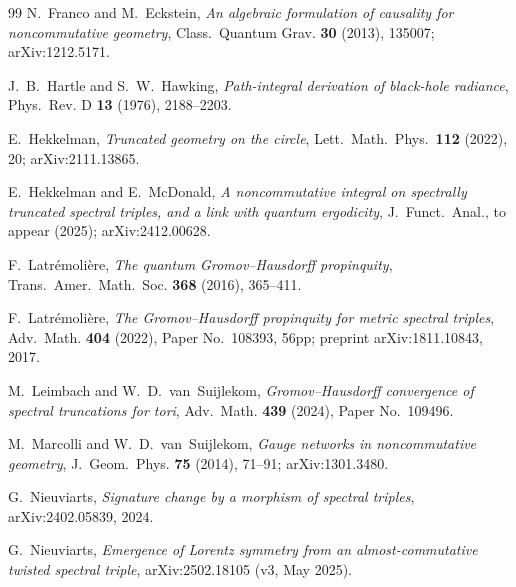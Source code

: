 \documentclass[11pt,a4paper]{article}
\theoremstyle{plain}
\theoremstyle{definition}
\begin{document}
\begin{thebibliography}{99}
N.~Franco and M.~Eckstein,
\newblock \emph{An algebraic formulation of causality for
noncommutative geometry},
\newblock Class.~Quantum Grav. \textbf{30} (2013), 135007;
\newblock arXiv:1212.5171.

J.~B.~Hartle and S.~W.~Hawking,
\newblock \emph{Path-integral derivation of black-hole radiance},
\newblock Phys.~Rev. D \textbf{13} (1976), 2188--2203.

E.~Hekkelman,
\newblock \emph{Truncated geometry on the circle},
\newblock Lett.\ Math.\ Phys.\ \textbf{112} (2022), 20;
\newblock arXiv:2111.13865.

E.~Hekkelman and E.~McDonald,
\newblock \emph{A noncommutative integral on spectrally truncated
spectral triples, and a link with quantum ergodicity},
\newblock J.~Funct.~Anal., to appear (2025);
\newblock arXiv:2412.00628.

F.~Latr\'emoli\`ere,
\newblock \emph{The quantum Gromov--Hausdorff propinquity},
\newblock Trans.~Amer.~Math.~Soc. \textbf{368} (2016), 365--411.

F.~Latr\'emoli\`ere,
\newblock \emph{The Gromov--Hausdorff propinquity for metric spectral
triples},
\newblock Adv.~Math. \textbf{404} (2022), Paper No.~108393, 56pp;
\newblock preprint arXiv:1811.10843, 2017.

M.~Leimbach and W.~D.~van~Suijlekom,
\newblock \emph{Gromov--Hausdorff convergence of spectral truncations
for tori},
\newblock Adv.~Math. \textbf{439} (2024), Paper No.~109496.

M.~Marcolli and W.~D.~van~Suijlekom,
\newblock \emph{Gauge networks in noncommutative geometry},
\newblock J.~Geom.~Phys. \textbf{75} (2014), 71--91;
\newblock arXiv:1301.3480.

G.~Nieuviarts,
\newblock \emph{Signature change by a morphism of spectral
triples},
\newblock arXiv:2402.05839, 2024.

G.~Nieuviarts,
\newblock \emph{Emergence of Lorentz symmetry from an
almost-commutative twisted spectral triple},
\newblock arXiv:2502.18105 (v3, May 2025).


\end{thebibliography}
\end{document}
